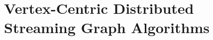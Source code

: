\documentclass[10]{report}
\begin{document}




\section{Vertex-Centric Distributed Streaming Graph Algorithms} \label{intro:sec:distributed_streaming}
\end{document}
